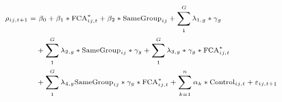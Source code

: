 \begin{equation*}
 \scriptsize
 \begin{split}
 \rho_{ij,t+1} = & \text{ 	}\beta_0   + \beta_1* \text{FCA}_{ij,t}^*  + \beta_2 * \text{SameGroup}_{ij} + \sum_1^G \lambda_{1,g} *\gamma_{g}\\
 &   + \sum_1^G \lambda_{2,g} * \text{SameGroup}_{ij} * \gamma_g + \sum_1^G \lambda_{3,g} *  \gamma_g  * \text{FCA}_{ij,t}^*  \\
  & + \sum_1^G \lambda_{4,g} \text{SameGroup}_{ij} * \gamma_g  * \text{FCA}_{ij,t}^*  + \sum_{k=1} ^{n} \alpha_k*\text{Control}_{ij,t} + \varepsilon_{ij,t+1}
 \end{split}
 \end{equation*}